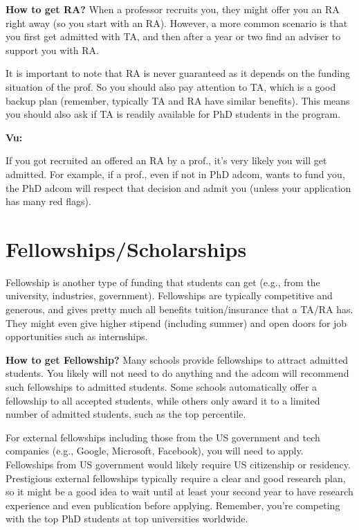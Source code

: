 \documentclass[oneside,11pt]{book}
\newenvironment{commentbox}[1][]{
  \small
  \begin{mybox}
    {\small \textbf{#1}}
  }{
  \end{mybox}
}
\begin{document}
\textbf{How to get RA?} When a professor recruits you, they might offer you an RA right away (so you start with an RA).  However, a more common scenario is that you first get admitted with TA, and then after a year or two find an adviser to support you with RA. 

It is important to note that RA is never guaranteed as it depends on the funding situation of the prof. So you should also pay attention to TA, which is a good backup plan (remember, typically TA and RA have similar benefits). This means you should also ask if TA is readily available for PhD students in the program.


\begin{commentbox}[Vu:]
  If you got recruited an offered an RA by a prof., it's very likely you will get admitted.  For example, if a prof., even if not in PhD adcom, wants to fund you, the PhD adcom will respect that decision and admit you (unless your application has many red flags).
\end{commentbox}

\section{Fellowships/Scholarships}\label{sec:fellowships}

Fellowship is another type of funding that students can get (e.g., from the university, industries, government).
Fellowships are typically competitive and generous, and gives pretty much all benefits tuition/insurance that a TA/RA has.  They might even give higher stipend (including summer) and open doors for job opportunities such as internships.

\textbf{How to get Fellowship?}   Many schools provide fellowships to attract admitted students. You likely will not need to do anything and the adcom will recommend such fellowships to admitted students. Some schools automatically offer a fellowship to all accepted students, while others only award it to a limited number of admitted students, such as the top percentile.

For external fellowships including those from the US government and tech companies (e.g., Google, Microsoft, Facebook), you will need to apply.  Fellowships from US government would likely require US citizenship or residency. %
Prestigious external fellowships typically require a clear and good research plan, so it might be a good idea to wait until at least your second year to have research experience and even publication before applying. Remember, you're competing with the top PhD students at top universities worldwide.
\end{document}
